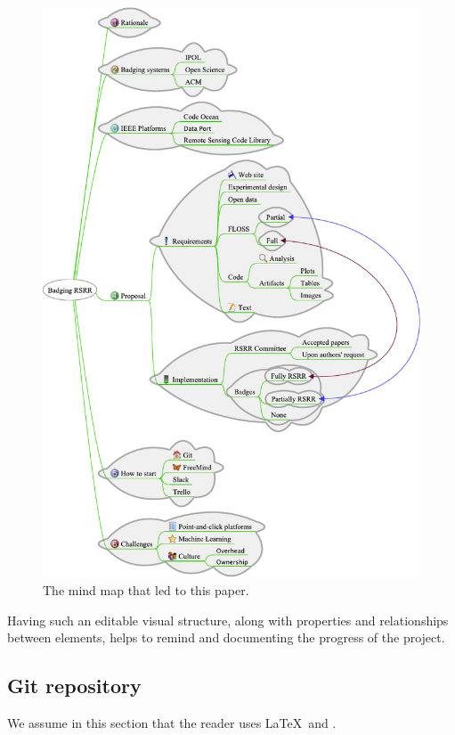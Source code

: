\documentclass[journal,twoside]{IEEEtran}
\begin{document}
\begin{figure}[hbt]
	\centering
	\includegraphics[width=\linewidth]{"Badging RSRR.pdf"}
	\caption{The mind map that led to this paper.}\label{Fig:Doodle}
\end{figure}

Having such an editable visual structure, along with properties and relationships between elements, helps to remind and documenting the progress of the project.

\subsection{Git repository}

We assume in this section that the reader uses \LaTeX\ and \BibTeX.
\end{document}
